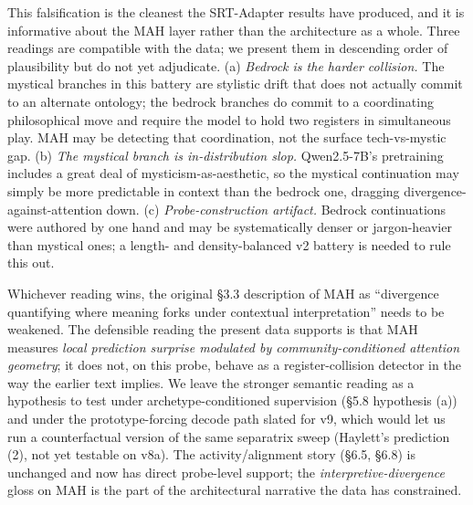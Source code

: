 \documentclass[
  11pt]{article}
\begin{document}
This falsification is the cleanest the SRT-Adapter results have
produced, and it is informative about the MAH layer rather than the
architecture as a whole. Three readings are compatible with the data; we
present them in descending order of plausibility but do not yet
adjudicate. (a) \emph{Bedrock is the harder collision.} The mystical
branches in this battery are stylistic drift that does not actually
commit to an alternate ontology; the bedrock branches do commit to a
coordinating philosophical move and require the model to hold two
registers in simultaneous play. MAH may be detecting that coordination,
not the surface tech-vs-mystic gap. (b) \emph{The mystical branch is
in-distribution slop.} Qwen2.5-7B's pretraining includes a great deal of
mysticism-as-aesthetic, so the mystical continuation may simply be more
predictable in context than the bedrock one, dragging
divergence-against-attention down. (c) \emph{Probe-construction
artifact.} Bedrock continuations were authored by one hand and may be
systematically denser or jargon-heavier than mystical ones; a length-
and density-balanced v2 battery is needed to rule this out.

Whichever reading wins, the original §3.3 description of MAH as
``divergence quantifying where meaning forks under contextual
interpretation'' needs to be weakened. The defensible reading the
present data supports is that MAH measures \emph{local prediction
surprise modulated by community-conditioned attention geometry}; it does
not, on this probe, behave as a register-collision detector in the way
the earlier text implies. We leave the stronger semantic reading as a
hypothesis to test under archetype-conditioned supervision (§5.8
hypothesis (a)) and under the prototype-forcing decode path slated for
v9, which would let us run a counterfactual version of the same
separatrix sweep (Haylett's prediction (2), not yet testable on v8a).
The activity/alignment story (§6.5, §6.8) is unchanged and now has
direct probe-level support; the \emph{interpretive-divergence} gloss on
MAH is the part of the architectural narrative the data has constrained.
\end{document}
